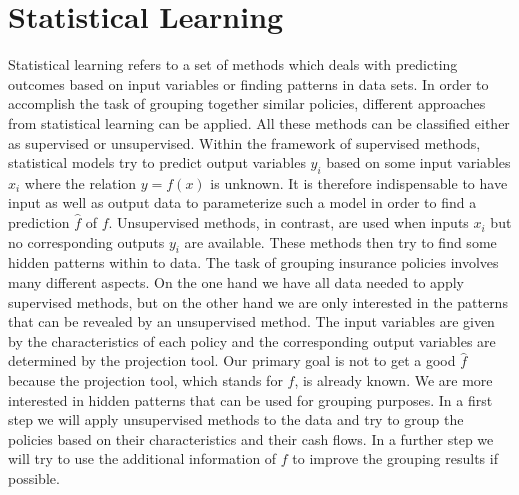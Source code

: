 \section{Statistical Learning}

Statistical learning refers to a set of methods which deals with predicting outcomes based on input variables or finding patterns in data sets. In order to accomplish the task of grouping together similar policies, different approaches from statistical learning can be applied. All these methods can be classified either as supervised or unsupervised. Within the framework of supervised methods, statistical models try to predict output variables $y_i$ based on some input variables $x_i$ where the relation $y=f(x)$ is unknown. It is therefore indispensable to have input as well as output data to parameterize such a model in order to find a prediction $\hat f$ of $f$. Unsupervised methods, in contrast, are used when inputs $x_i$ but no corresponding outputs $y_i$ are available. These methods then try to find some hidden patterns within to data. The task of grouping insurance policies involves many different aspects. On the one hand we have all data needed to apply supervised methods, but on the other hand we are only interested in the patterns that can be revealed by an unsupervised method. The input variables are given by the characteristics of each policy and the corresponding output variables are determined by the projection tool. Our primary goal is not to get a good $\hat f$ because the projection tool, which stands for $f$, is already known. We are more interested in hidden patterns that can be used for grouping purposes. In a first step we will apply unsupervised methods to the data and try to group the policies based on their characteristics and their cash flows. In a further step we will try to use the additional information of $f$ to improve the grouping results if possible. 

